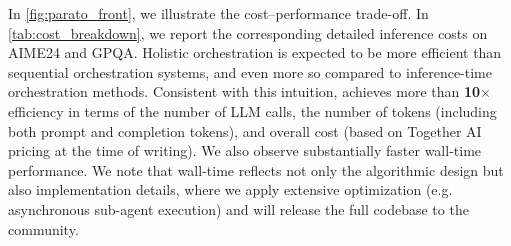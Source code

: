 In \cref{fig:parato_front}, we illustrate the cost–performance trade-off. In \cref{tab:cost_breakdown}, we report the corresponding detailed inference costs on AIME24 and GPQA. Holistic orchestration is expected to be more efficient than sequential orchestration systems, and even more so compared to inference-time orchestration methods. Consistent with this intuition, \ourframework achieves more than \textbf{10$\times$} efficiency in terms of the number of LLM calls, the number of tokens (including both prompt and completion tokens), and overall cost (based on Together AI pricing at the time of writing). We also observe substantially faster wall-time performance. We note that wall-time reflects not only the algorithmic design but also implementation details, where we apply extensive optimization (e.g. asynchronous sub-agent execution) and will release the full codebase to the community.




